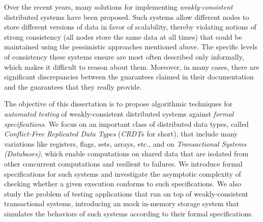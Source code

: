 Over the recent years, many solutions for implementing \emph{weakly-consistent} distributed systems have been proposed.
Such systems allow different nodes to store different versions of data in favor of scalability, thereby violating notions of strong consistency (all nodes store the same data at all times) that could be maintained using the pessimistic approaches mentioned above. 
%
%
The specific levels of consistency these systems ensure are most often described only informally, which makes it difficult to reason about them.
Moreover, in many cases, there are significant discrepancies between the guarantees claimed in their documentation and the guarantees that they really provide.


The objective of this dissertation is to propose algorithmic techniques for \emph{automated testing} of weakly-consistent distributed systems against \emph{formal specifications}. We focus on an important class of distributed data types, called \emph{Conflict-Free Replicated Data Types} (\emph{CRDT}s for short), that include many variations like registers, flags, sets, arrays, etc., and on \emph{Transactional Systems (Databases)}, which enable computations on shared data that are isolated from other concurrent computations and resilient to failures. We introduce formal specifications for such systems and investigate the asymptotic complexity of checking whether a given execution conforms to such specifications. We also 
study the problem of testing applications that run on top of weakly-consistent transactional systems, introducing an mock in-memory storage system that simulates the behaviors of such systems according to their formal specifications.

